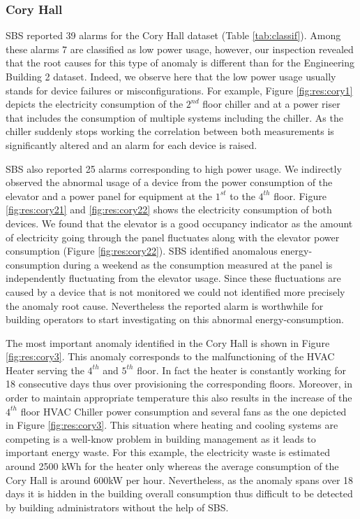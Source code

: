 \subsubsection{Cory Hall}
SBS reported 39 alarms for the Cory Hall dataset (Table \ref{tab:classif}).
Among these alarms 7 are classified as low power usage, however, our inspection revealed that the root causes for this type of anomaly is different than for the Engineering Building 2 dataset.
Indeed, we observe here that the low power usage usually stands for device failures or misconfigurations.
For example, Figure \ref{fig:res:cory1} depicts the electricity consumption of the $2^{nd}$ floor chiller and at a power riser that includes the consumption of multiple systems including the chiller.
As the chiller suddenly stops working the correlation between both measurements is significantly altered and an alarm for each device is raised.

SBS also reported 25 alarms corresponding to high power usage. 
We indirectly observed the abnormal usage of a device from the power consumption of the elevator and a power panel for equipment at the $1^{st}$ to the $4^{th}$ floor.
Figure \ref{fig:res:cory21} and \ref{fig:res:cory22} shows the electricity consumption of both devices. 
We found that the elevator is a good occupancy indicator as the amount of electricity going through the panel fluctuates along with the elevator power consumption (Figure \ref{fig:res:cory22}).
SBS identified anomalous energy-consumption during a weekend  as the consumption measured at the panel is independently fluctuating from the elevator usage.
Since these fluctuations are caused by a device that is not monitored we could not identified more precisely the anomaly root cause. Nevertheless the reported alarm is worthwhile for building operators to start investigating on this abnormal energy-consumption.

The most important anomaly identified in the Cory Hall is shown in Figure \ref{fig:res:cory3}.
This anomaly corresponds to the malfunctioning of the HVAC Heater serving the $4^{th}$ and $5^{th}$ floor. 
In fact the heater is constantly working for 18 consecutive days thus over provisioning the corresponding floors.
Moreover, in order to maintain appropriate temperature this also results in the increase of the $4^{th}$ floor HVAC Chiller power consumption and several fans as the one depicted in Figure \ref{fig:res:cory3}.
This situation where heating and cooling systems are competing is a well-know problem in building management as it leads to important energy waste.
For this example, the electricity waste is estimated around 2500 kWh for the heater only whereas the average consumption of the Cory Hall is around 600kW per hour.
Nevertheless, as the anomaly spans over 18 days it is hidden in the building overall consumption thus difficult to be detected by building administrators without the help of SBS.
